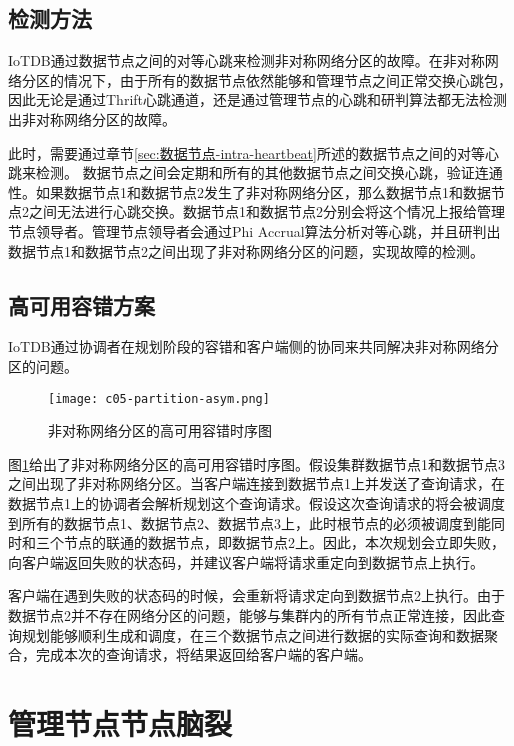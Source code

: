 \subsection{检测方法}

IoTDB通过数据节点之间的对等心跳来检测非对称网络分区的故障。在非对称网络分区的情况下，由于所有的数据节点依然能够和管理节点之间正常交换心跳包，因此无论是通过Thrift心跳通道，还是通过管理节点的心跳和研判算法都无法检测出非对称网络分区的故障。

此时，需要通过章节\ref{sec:数据节点-intra-heartbeat}所述的数据节点之间的对等心跳来检测。
数据节点之间会定期和所有的其他数据节点之间交换心跳，验证连通性。如果数据节点1和数据节点2发生了非对称网络分区，那么数据节点1和数据节点2之间无法进行心跳交换。数据节点1和数据节点2分别会将这个情况上报给管理节点领导者。管理节点领导者会通过Phi Accrual算法分析对等心跳，并且研判出数据节点1和数据节点2之间出现了非对称网络分区的问题，实现故障的检测。


\subsection{高可用容错方案}

IoTDB通过协调者在规划阶段的容错和客户端侧的协同来共同解决非对称网络分区的问题。

\begin{figure}
    \centering
    \texttt{[image: c05-partition-asym.png]}
    \caption{非对称网络分区的高可用容错时序图}
    \label{fig:c05-partition-asym}
\end{figure}

图\ref{fig:c05-partition-asym}给出了非对称网络分区的高可用容错时序图。假设集群数据节点1和数据节点3之间出现了非对称网络分区。当客户端连接到数据节点1上并发送了查询请求，在数据节点1上的协调者会解析规划这个查询请求。假设这次查询请求的\fragmentinstance 将会被调度到所有的数据节点1、数据节点2、数据节点3上，此时根节点的\fragmentinstance 必须被调度到能同时和三个节点的联通的数据节点，即数据节点2上。因此，本次规划会立即失败，向客户端返回失败的状态码，并建议客户端将请求重定向到数据节点上执行。

客户端在遇到失败的状态码的时候，会重新将请求定向到数据节点2上执行。由于数据节点2并不存在网络分区的问题，能够与集群内的所有节点正常连接，因此查询规划能够顺利生成和调度，在三个数据节点之间进行数据的实际查询和数据聚合，完成本次的查询请求，将结果返回给客户端的客户端。

\section{管理节点节点脑裂}

